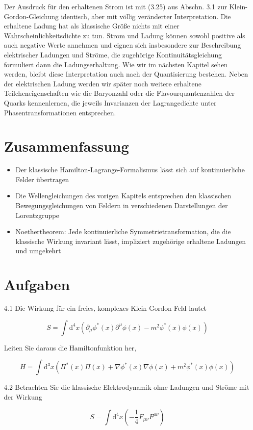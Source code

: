 \documentclass[10pt, letterpaper]{article}
\begin{document}
Der Ausdruck für den erhaltenen Strom ist mit (3.25) aus Abschn. 3.1 zur Klein-Gordon-Gleichung identisch, aber mit völlig veränderter Interpretation. Die erhaltene Ladung hat als klassische Größe nichts mit einer Wahrscheinlichkeitsdichte zu tun. Strom und Ladung können sowohl positive als auch negative Werte annehmen und eignen sich insbesondere zur Beschreibung elektrischer Ladungen und Ströme, die zugehörige Kontinuitätsgleichung formuliert dann die Ladungserhaltung. Wie wir im nächsten Kapitel sehen werden, bleibt diese Interpretation auch nach der Quantisierung bestehen. Neben der elektrischen Ladung werden wir später noch weitere erhaltene Teilcheneigenschaften wie die Baryonzahl oder die Flavourquantenzahlen der Quarks kennenlernen, die jeweils Invarianzen der Lagrangedichte unter Phasentransformationen entsprechen.

\section*{Zusammenfassung}
\begin{itemize}
  \item Der klassische Hamilton-Lagrange-Formalismus lässt sich auf kontinuierliche Felder übertragen
  \item Die Wellengleichungen des vorigen Kapitels entsprechen den klassischen Bewegungsgleichungen von Feldern in verschiedenen Darstellungen der Lorentzgruppe
  \item Noethertheorem: Jede kontinuierliche Symmetrietransformation, die die klassische Wirkung invariant lässt, impliziert zugehörige erhaltene Ladungen und umgekehrt
\end{itemize}

\section*{Aufgaben}
4.1 Die Wirkung für ein freies, komplexes Klein-Gordon-Feld lautet

$$
S=\int \mathrm{d}^{4} x\left(\partial_{\mu} \phi^{*}(x) \partial^{\mu} \phi(x)-m^{2} \phi^{*}(x) \phi(x)\right)
$$

Leiten Sie daraus die Hamiltonfunktion her,

$$
H=\int \mathrm{d}^{3} x\left(\Pi^{*}(x) \Pi(x)+\nabla \phi^{*}(x) \nabla \phi(x)+m^{2} \phi^{*}(x) \phi(x)\right)
$$

4.2 Betrachten Sie die klassische Elektrodynamik ohne Ladungen und Ströme mit der Wirkung

$$
S=\int \mathrm{d}^{4} x\left(-\frac{1}{4} F_{\mu \nu} F^{\mu \nu}\right)
$$
\end{document}
